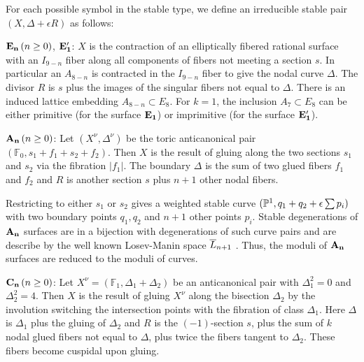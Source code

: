 \documentclass[table,x11names]{amsart}
\begin{document}


\begin{definition}\label{def:stab}
For each possible symbol in the stable type, we define an
irreducible stable pair $(X, \Delta + \epsilon R)$ as follows:

\smallskip
${\bf E_n} \,(n\geq 0)$, ${\bf E_1'}$:
$X$ is the contraction of an elliptically fibered rational surface with 
an $I_{9-n}$ fiber along all components of fibers not meeting a section $s$.
In particular an $A_{8-n}$ is contracted in the $I_{9-n}$ fiber to give the nodal
curve $\Delta$. The divisor $R$ is $s$ plus the images of the
singular fibers not equal to $\Delta$. There is an induced lattice embedding
$A_{8-n} \subset E_8$. For $k=1$, the inclusion $A_7\subset E_8$ can be
either primitive (for the surface ${\bf E_1}$) or imprimitive (for the
surface ${\bf E_1'}$).

\smallskip
${\bf A_n}\,(n\ge 0)$: Let $(X^\nu,\Delta^\nu)$ be the toric anticanonical pair
$(\mathbb{F}_0,s_1+f_1+s_2+f_2)$. Then $X$ is the result of
gluing along the two sections $s_1$ and $s_2$ via the fibration $|f_1|$. The
boundary $\Delta$ is the sum of two glued fibers $f_1$ and $f_2$ and
$R$ is another section $s$ plus $n+1$ other nodal fibers. 

Restricting to either $s_1$ or $s_2$ gives a weighted stable curve
$({\mathbb P}^1, q_1+q_2 +\epsilon \sum p_i)$ with two boundary points
$q_1,q_2$ and $n+1$ other points $p_i$. Stable degenerations of ${\bf A_n}$
surfaces are in a bijection with degenerations of such curve
pairs and are describe by the well known Losev-Manin space ${\overline L}_{n+1}$
\cite{losev2000new-moduli-spaces}. Thus, the moduli of ${\bf A_n}$ surfaces
are reduced to the moduli of curves. 

\smallskip
${\bf C_n}\,(n\ge0)$: Let $X^\nu=(\mathbb{F}_1, \Delta_1+\Delta_2)$ be an
anticanonical pair with $\Delta_1^2=0$ and $\Delta_2^2=4$. Then $X$ is the result of
gluing $X^\nu$ along the bisection $\Delta_2$ by the involution
switching the intersection points with the fibration of class $\Delta_1$. Here $\Delta$ is
$\Delta_1$ plus the gluing of $\Delta_2$ and $R$ is the $(-1)$-section $s$, plus
the sum of $k$ nodal glued fibers not equal to $\Delta$, plus twice the fibers
tangent to $\Delta_2$. These fibers become cuspidal upon gluing.


\end{definition}
\end{document}
